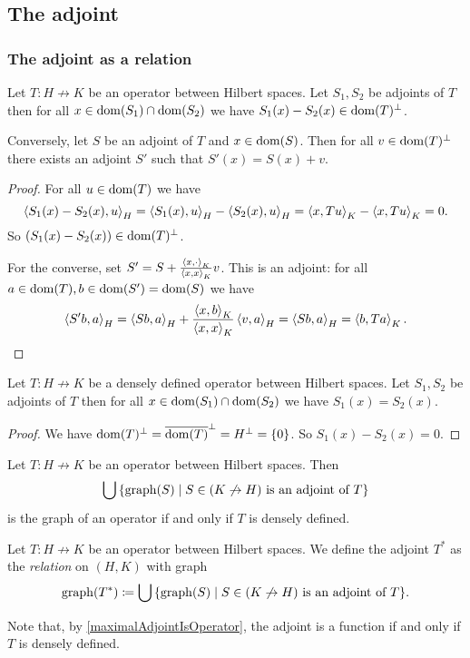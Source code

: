 \subsection{The adjoint}
\subsubsection{The adjoint as a relation}
\begin{lemma}
Let $T: H\not\to K$ be an operator between Hilbert spaces. Let $S_1, S_2$ be adjoints of $T$ then for all $x\in \operatorname{dom}(S_1)\cap\operatorname{dom}(S_2)$ we have $S_1(x) - S_2(x) \in \operatorname{dom}(T)^\perp$.

Conversely, let $S$ be an adjoint of $T$ and $x\in\operatorname{dom}(S)$. Then for all $v\in \operatorname{dom}(T)^\perp$ there exists an adjoint $S'$ such that $S'(x) = S(x) + v$.
\end{lemma}
\begin{proof}
For all $u\in \operatorname{dom}(T)$ we have
\[ \left\langle S_1(x) - S_2(x), u \right\rangle_H = \left\langle S_1(x), u \right\rangle_H - \left\langle S_2(x), u \right\rangle_H = \left\langle x, Tu \right\rangle_K - \left\langle x, Tu \right\rangle_K = 0. \]
So $(S_1(x) - S_2(x)) \in \operatorname{dom}(T)^\perp$.

For the converse, set $S' = S + \frac{\left\langle x,\cdot \right\rangle_K}{\left\langle x,x \right\rangle_K}v$. This is an adjoint: for all $a\in \operatorname{dom}(T), b\in \operatorname{dom}(S') = \operatorname{dom}(S)$ we have
\[  \left\langle S' b,a \right\rangle_H = \left\langle Sb, a \right\rangle_H + \frac{\left\langle x,b \right\rangle_K}{\left\langle x,x \right\rangle_K}\left\langle v,a \right\rangle_H = \left\langle Sb, a \right\rangle_H = \left\langle b,Ta \right\rangle_K. \]
\end{proof}
\begin{corollary} \label{agreementAdjoints}
Let $T: H\not\to K$ be a densely defined operator between Hilbert spaces. Let $S_1, S_2$ be adjoints of $T$ then for all $x\in \operatorname{dom}(S_1)\cap\operatorname{dom}(S_2)$ we have $S_1(x) = S_2(x)$.
\end{corollary}
\begin{proof}
We have $\operatorname{dom}(T)^\perp = \overline{\operatorname{dom}(T)}^\perp = H^\perp = \{0\}$. So $S_1(x) - S_2(x) = 0$.
\end{proof}
\begin{corollary} \label{maximalAdjointIsOperator}
Let $T: H\not\to K$ be an operator between Hilbert spaces. Then
\[ \bigcup\setbuilder{\graph(S)}{\text{$S\in (K\not\to H)$ is an adjoint of $T$}} \]
is the graph of an operator \textup{if and only if} $T$ is densely defined.
\end{corollary}

\begin{definition}
Let $T: H\not\to K$ be an operator between Hilbert spaces. We define the adjoint $T^*$ as the \emph{relation} on $(H,K)$ with graph
\[ \graph(T^*) \defeq \bigcup\setbuilder{\graph(S)}{\text{$S\in (K\not\to H)$ is an adjoint of $T$}}. \]
\end{definition}
Note that, by \ref{maximalAdjointIsOperator}, the adjoint is a function if and only if $T$ is densely defined.

